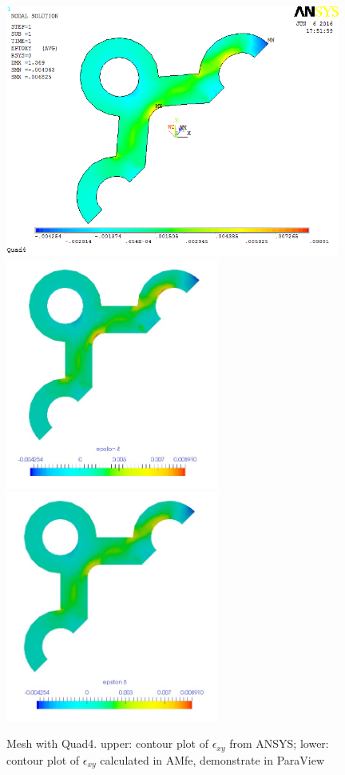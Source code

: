 \begin{figure}[htbp]
	\begin{center}
		\includegraphics[width=11cm,clip]{Quad4_Exy.png} 	
		\includegraphics[width=7cm,clip]{Quad4_Exy_PD.png} 		
		\includegraphics[width=7cm,clip]{Quad4_Exy_P.png} 		
		\caption{Mesh with Quad4. upper: contour plot of $\epsilon_{xy}$ from ANSYS; lower: contour plot of $\epsilon_{xy}$ calculated in AMfe, demonstrate in ParaView} \label{fig: Quad4_Exy}
	\end{center}
\end{figure}
\clearpage 

